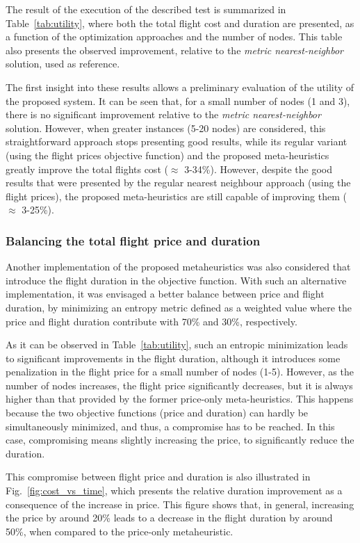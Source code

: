 \documentclass[onecolumn]{elsarticle}
\begin{document}
The result of the execution of the described test is summarized in Table~\ref{tab:utility}, where both the total flight cost and duration are presented, as a function of the optimization approaches and the number of nodes. This table also presents the observed improvement, relative to the \textit{metric nearest-neighbor} solution, used as reference.

The first insight into these results allows a preliminary evaluation of the utility of the proposed system. It can be seen that, for a small number of nodes (1 and 3), there is no significant improvement relative to the \textit{metric nearest-neighbor} solution. However, when greater instances (5-20 nodes) are considered, this straightforward approach stops presenting good results, while its regular variant (using the flight prices objective function) and the proposed meta-heuristics greatly improve the total flights cost ($\approx$ 3-34\%). However, despite the good results that were presented by the regular nearest neighbour approach (using the flight prices), the proposed meta-heuristics are still capable of improving them ($\approx$ 3-25\%).    


\subsubsection{Balancing the total flight price and duration}

Another implementation of the proposed metaheuristics was also considered that introduce the flight duration in the objective function. With such an alternative implementation, it was envisaged a better balance between price and flight duration, by minimizing an entropy metric defined as a weighted value where the price and flight duration contribute with 70\% and 30\%, respectively.

As it can be observed in Table~\ref{tab:utility}, such an entropic minimization leads to significant improvements in the flight duration, although it introduces some penalization in the flight price for a small number of nodes (1-5). However, as the number of nodes increases, the flight price significantly decreases, but it is always higher than that provided by the former price-only meta-heuristics. This happens because the two objective functions (price and duration) can hardly be simultaneously minimized, and thus, a compromise has to be reached. In this case, compromising means slightly increasing the price, to significantly reduce the duration.

This compromise between flight price and duration is also illustrated in Fig.~\ref{fig:cost_vs_time}, which presents the relative duration improvement as a consequence of the increase in price. This figure shows that, in general, increasing the price by around 20\% leads to a decrease in the flight duration by around 50\%, when compared to the price-only metaheuristic.
\end{document}
